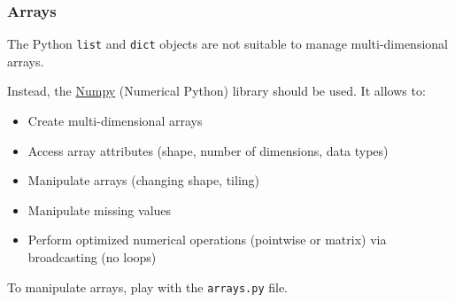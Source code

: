 \begin{frame}[fragile]
\frametitle{Arrays}

    The Python \verb+list+ and \verb+dict+ objects are not suitable to manage multi-dimensional arrays. 
    \vspace{1em}

    Instead, the \href{https://numpy.org/}{Numpy} (Numerical Python) library should be used. It allows to:
    \begin{itemize}
        \item{Create multi-dimensional arrays}
        \item{Access array attributes (shape, number of dimensions, data types)}
        \item{Manipulate arrays (changing shape, tiling)}
        \item{Manipulate missing values} 
        \item{Perform optimized numerical operations (pointwise or matrix) via broadcasting (no loops)}
    \end{itemize}

    To manipulate arrays, play with the \verb+arrays.py+ file.

\end{frame}

